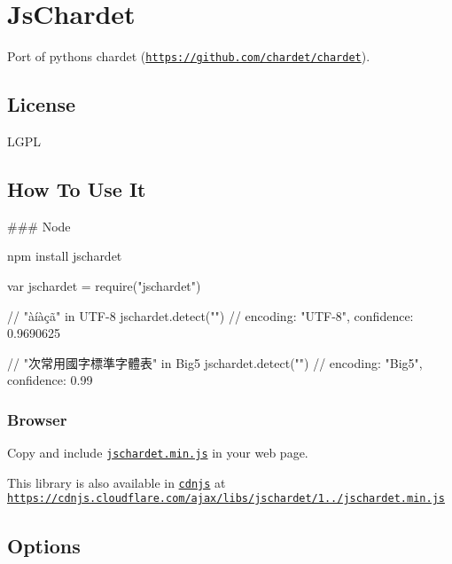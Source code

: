 \href{https://nodei.co/npm/jschardet/}{\tt }

\section*{Js\+Chardet }

Port of python\textquotesingle{}s chardet (\href{https://github.com/chardet/chardet}{\tt https\+://github.\+com/chardet/chardet}).

\subsection*{License }

L\+G\+PL

\subsection*{How To Use It }

\#\#\# Node 
\begin{DoxyCode}
npm install jschardet
\end{DoxyCode}
 \begin{DoxyVerb}var jschardet = require("jschardet")

// "àíàçã" in UTF-8
jschardet.detect("\xad{}")
// { encoding: "UTF-8", confidence: 0.9690625 }

// "次常用國字標準字體表" in Big5
jschardet.detect("\xce{}\xea{}\xbc{}\xaa\xed")
// { encoding: "Big5", confidence: 0.99 }
\end{DoxyVerb}


\subsubsection*{Browser}

Copy and include \href{https://github.com/aadsm/jschardet/tree/master/dist/jschardet.min.js}{\tt jschardet.\+min.\+js} in your web page.

This library is also available in \href{https://cdnjs.com}{\tt cdnjs} at \href{https://cdnjs.cloudflare.com/ajax/libs/jschardet/1.4.1/jschardet.min.js}{\tt https\+://cdnjs.\+cloudflare.\+com/ajax/libs/jschardet/1../jschardet.\+min.\+js}

\subsection*{Options }


